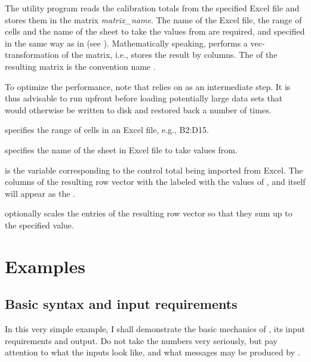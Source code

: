 The utility program  reads the calibration totals from
the specified Excel file and stores them in the matrix {\it matrix\_name}.
The name of the Excel file, the range of cells and the name of
the sheet to take the values from are required, and specified in the same
way as in  (see ).
Mathematically speaking,  performs a
vec-transformation of the matrix, i.e., stores the result by columns.
The  of the resulting
    matrix is the convention name .

To optimize the performance, note that  relies on
 as an intermediate step. It is thus advisable to run
 upfront before loading potentially large data sets that
would otherwise be written to disk and restored back a number of times.


\hangpara
       specifies the range of cells in an Excel file, e.g., B2:D15.

\hangpara
     specifies the name of the sheet in Excel file to take values from.

\hangpara
     is the variable corresponding to the control total being
    imported from Excel. The columns of the resulting row vector with the
    labeled with the values of \varname, and \varname itself will appear
    as the .

\hangpara
     optionally scales the entries of
    the resulting row vector so that they sum up to the specified value.





\section{Examples}
\label{sec:examples}

\subsection{Basic syntax and input requirements}
\label{subsec:basic}

In this very simple example, I shall demonstrate the basic mechanics of
, its input requirements and output. Do not take the numbers
very seriously, but pay attention to what the inputs look like, and what
messages may be produced by .


